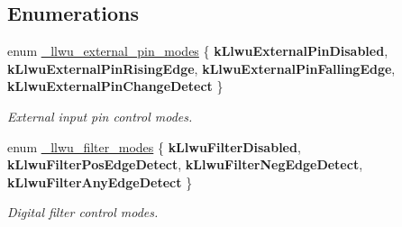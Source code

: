 \subsection*{Enumerations}
\begin{DoxyCompactItemize}
\item 
enum \hyperlink{group__llwu__hal_gaacfc7183624cb7e29378dd7ef281400f}{\+\_\+llwu\+\_\+external\+\_\+pin\+\_\+modes} \{ {\bfseries k\+Llwu\+External\+Pin\+Disabled}, 
{\bfseries k\+Llwu\+External\+Pin\+Rising\+Edge}, 
{\bfseries k\+Llwu\+External\+Pin\+Falling\+Edge}, 
{\bfseries k\+Llwu\+External\+Pin\+Change\+Detect}
 \}\hypertarget{group__llwu__hal_gaacfc7183624cb7e29378dd7ef281400f}{}\label{group__llwu__hal_gaacfc7183624cb7e29378dd7ef281400f}
\begin{DoxyCompactList}\small\item\em External input pin control modes. \end{DoxyCompactList}
\item 
enum \hyperlink{group__llwu__hal_ga6f39ca3519f267f6c98e9addd24da8d5}{\+\_\+llwu\+\_\+filter\+\_\+modes} \{ {\bfseries k\+Llwu\+Filter\+Disabled}, 
{\bfseries k\+Llwu\+Filter\+Pos\+Edge\+Detect}, 
{\bfseries k\+Llwu\+Filter\+Neg\+Edge\+Detect}, 
{\bfseries k\+Llwu\+Filter\+Any\+Edge\+Detect}
 \}\hypertarget{group__llwu__hal_ga6f39ca3519f267f6c98e9addd24da8d5}{}\label{group__llwu__hal_ga6f39ca3519f267f6c98e9addd24da8d5}
\begin{DoxyCompactList}\small\item\em Digital filter control modes. \end{DoxyCompactList}
\end{DoxyCompactItemize}
